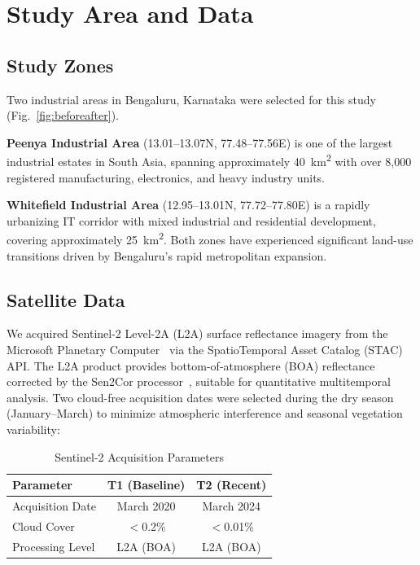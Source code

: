 \documentclass[conference,10pt]{IEEEtran}
\begin{document}
\section{Study Area and Data}

\subsection{Study Zones}

Two industrial areas in Bengaluru, Karnataka were selected for this study (Fig.~\ref{fig:beforeafter}).

\noindent\textbf{Peenya Industrial Area} (13.01--13.07\textdegree{}N, 77.48--77.56\textdegree{}E) is one of the largest industrial estates in South Asia, spanning approximately 40~km\textsuperscript{2} with over 8,000 registered manufacturing, electronics, and heavy industry units.

\noindent\textbf{Whitefield Industrial Area} (12.95--13.01\textdegree{}N, 77.72--77.80\textdegree{}E) is a rapidly urbanizing IT corridor with mixed industrial and residential development, covering approximately 25~km\textsuperscript{2}. Both zones have experienced significant land-use transitions driven by Bengaluru's rapid metropolitan expansion.

\subsection{Satellite Data}

We acquired Sentinel-2 Level-2A (L2A) surface reflectance imagery from the Microsoft Planetary Computer~\cite{pc2023} via the SpatioTemporal Asset Catalog (STAC) API. The L2A product provides bottom-of-atmosphere (BOA) reflectance corrected by the Sen2Cor processor~\cite{drusch2012}, suitable for quantitative multitemporal analysis. Two cloud-free acquisition dates were selected during the dry season (January--March) to minimize atmospheric interference and seasonal vegetation variability:

\begin{table}[h]
\centering
\caption{Sentinel-2 Acquisition Parameters}
\label{tab:acq}
\begin{tabular}{lcc}
\toprule
\textbf{Parameter} & \textbf{T1 (Baseline)} & \textbf{T2 (Recent)} \\
\midrule
Acquisition Date & March 2020 & March 2024 \\
Cloud Cover & $<$0.2\% & $<$0.01\% \\
Processing Level & L2A (BOA) & L2A (BOA) \\
\bottomrule
\end{tabular}
\end{table}
\end{document}
